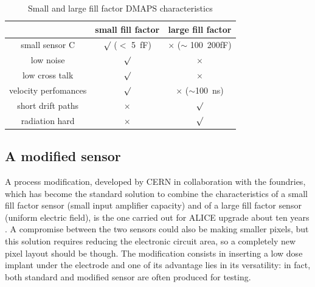       \begin{table}
         \begin{center}
         \begin{tabular}{|c | c |c |}
         \hline
         & small fill factor & large fill factor\\
         \hline
         \hline
         small sensor C & $\surd$ ($<$ \SI{5}{fF}) & $\times$ ($\sim$ \SI{100}{200}{fF})\\
         low noise & $\surd$ & $\times$\\
         low cross talk & $\surd$ & $\times$ \\
         velocity perfomances & $\surd$ & $\times$ ($\sim$\SI{100}{ns})\\
         short drift paths & $\times$ & $\surd$ \\
         radiation hard & $\times$ & $\surd$ \\
         \hline
         \end{tabular}
         \caption{Small and large fill factor DMAPS characteristics}
         \label{tab:DMAPS_large_small_fillfactor}
         \end{center}
      \end{table}

   \subsection{A modified sensor}\label{chap:a_modified_sensor}
      A process modification, developed by CERN in collaboration with the foundries, which has become the standard solution to combine the characteristics of a small fill factor sensor (small input amplifier capacity) and of a large fill factor sensor (uniform electric field), is the one carried out for ALICE upgrade about ten years \cite{AProcessModification}.
      A compromise between the two sensors could also be making smaller pixels, but this solution requires reducing the electronic circuit area, so a completely new pixel layout should be though. The modification consists in inserting a low dose implant under the electrode and one of its advantage lies in its versatility: in fact, both standard and modified sensor are often produced for testing.

